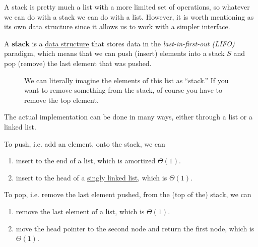   A stack is pretty much a list with a more limited set of operations, so whatever we can do with a stack we can do with a list. However, it is worth mentioning as its own data structure since it allows us to work with a simpler interface. 

  \begin{definition}[Stack]
    \label{def:stack}
    A \textbf{stack} is a \hyperref[def:data-structure]{data structure} that stores data in the \textit{last-in-first-out (LIFO)} paradigm, which means that we can push (insert) elements into a stack $S$ and pop (remove) the last element that was pushed. 

    \begin{figure}[H]
      \centering 
      \caption{We can literally imagine the elements of this list as ``stack.'' If you want to remove something from the stack, of course you have to remove the top element. } 
      \label{fig:stack}
    \end{figure}
  \end{definition} 

  The actual implementation can be done in many ways, either through a list or a linked list. 

  \begin{algo}
    To push, i.e. add an element, onto the stack, we can 
    \begin{enumerate}
      \item insert to the end of a list, which is amortized $\Theta(1)$. 
      \item insert to the head of a \hyperref[def:singly-linked-list]{singly linked list}, which is $\Theta(1)$. 
    \end{enumerate}
  \end{algo}

  \begin{algo}
    To pop, i.e. remove the last element pushed, from the (top of the) stack, we can 
    \begin{enumerate}
      \item remove the last element of a list, which is $\Theta(1)$. 
      \item move the head pointer to the second node and return the first node, which is $\Theta(1)$. 
    \end{enumerate}
  \end{algo}

